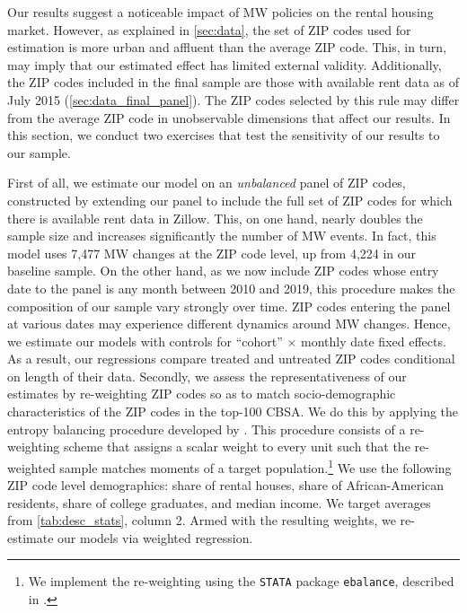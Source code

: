 Our results suggest a noticeable impact of MW policies on the rental housing market. However, as 
explained in \autoref{sec:data}, the set of ZIP codes used for estimation is more urban and affluent than 
the average ZIP code. This, in turn, may imply that our estimated effect 
has limited external validity. Additionally, the ZIP codes included in the final sample are those 
with available rent data as of July 2015 (\autoref{sec:data_final_panel}). The ZIP codes selected
by this rule may differ from the average ZIP code in unobservable dimensions that affect our 
results. In this section, we conduct two exercises that test the sensitivity of our results to our sample.

First of all, we estimate our model on an \textit{unbalanced} panel of ZIP codes, constructed by 
extending our panel to include the full set of ZIP codes for which there is available rent data 
in Zillow. This, on one hand, nearly doubles the sample size and increases significantly the 
number of MW events. In fact, this model uses 7,477 MW changes at the ZIP code level, up from
4,224 in our baseline sample. %
On the other hand, as we now include ZIP codes whose entry date to the panel is any month between
2010 and 2019, this procedure makes the composition of our sample vary strongly over time. ZIP 
codes entering the panel at various dates may experience different dynamics around MW changes.  
Hence, we estimate our models with controls for ``cohort'' $\times$ monthly date fixed effects. 
As a result, our regressions compare treated and untreated ZIP codes conditional on length of 
their data. Secondly, we assess the representativeness of our estimates by re-weighting ZIP codes so as to 
match socio-demographic characteristics of the ZIP codes in the top-100 CBSA. We do this by 
applying the entropy balancing procedure developed by \cite{hainmueller2012entropy}. 
This procedure consists of a re-weighting scheme that assigns a scalar weight to every unit 
such that the re-weighted sample matches moments of a target population.\footnote{We implement 
	the re-weighting using the \texttt{STATA} package \texttt{ebalance}, described in 
	\textcite{hainmueller2013ebalance}.} 
We use the following ZIP code level demographics: share of rental houses, share of 
African-American residents, share of college graduates, and median income. We target averages 
from \autoref{tab:desc_stats}, column 2. Armed with the resulting weights, we re-estimate our 
models via weighted regression.

